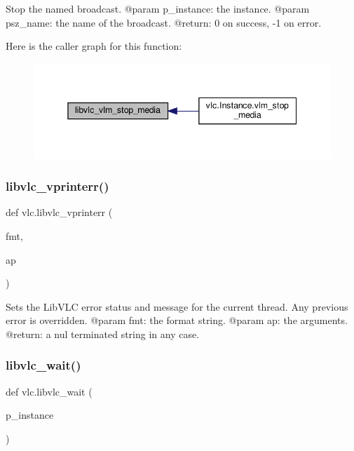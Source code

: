 \begin{DoxyVerb}Stop the named broadcast.
@param p_instance: the instance.
@param psz_name: the name of the broadcast.
@return: 0 on success, -1 on error.
\end{DoxyVerb}
 Here is the caller graph for this function\+:
\nopagebreak
\begin{figure}[H]
\begin{center}
\leavevmode
\includegraphics[width=345pt]{namespacevlc_a9ad79a1cc59f030bc4dbbfaa8ca7924e_icgraph}
\end{center}
\end{figure}
\mbox{\label{namespacevlc_a0282aceb7f75c89abe13b1b3e31cf077}} 
\subsubsection{\texorpdfstring{libvlc\+\_\+vprinterr()}{libvlc\_vprinterr()}}
{\footnotesize\ttfamily def vlc.\+libvlc\+\_\+vprinterr (\begin{DoxyParamCaption}\item[{}]{fmt,  }\item[{}]{ap }\end{DoxyParamCaption})}

\begin{DoxyVerb}Sets the LibVLC error status and message for the current thread.
Any previous error is overridden.
@param fmt: the format string.
@param ap: the arguments.
@return: a nul terminated string in any case.
\end{DoxyVerb}
 \mbox{\label{namespacevlc_a613ca585b96e960eb518af03fec03484}} 
\subsubsection{\texorpdfstring{libvlc\+\_\+wait()}{libvlc\_wait()}}
{\footnotesize\ttfamily def vlc.\+libvlc\+\_\+wait (\begin{DoxyParamCaption}\item[{}]{p\+\_\+instance }\end{DoxyParamCaption})}

